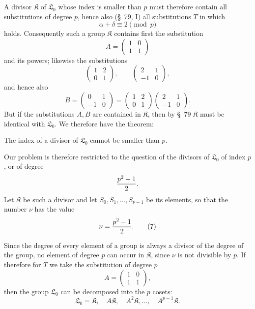 \documentclass[11pt]{article}
\providecommand{\Lzero}{\mathfrak L_0}
\providecommand{\Kgrp}{\mathfrak K}
\begin{document}
A divisor $\Kgrp$ of $\Lzero$ whose index is smaller than $p$ must therefore contain all substitutions of degree $p$, hence also (\S~79, I) all substitutions $T$ in which
\begin{equation}
 \alpha+\delta\equiv2\pmod p
\tag{4}
\end{equation}
holds. Consequently such a group $\Kgrp$ contains first the substitution
\begin{equation}
 A=\begin{pmatrix}1&0\\1&1\end{pmatrix}
\tag{5}
\end{equation}
and its powers; likewise the substitutions
\[
 \begin{pmatrix}1&2\\0&1\end{pmatrix},\qquad
 \begin{pmatrix}2&1\\-1&0\end{pmatrix},
\]
and hence also
\begin{equation}
 B=\begin{pmatrix}0&1\\-1&0\end{pmatrix}
 =
 \begin{pmatrix}1&2\\0&1\end{pmatrix}
 \begin{pmatrix}2&1\\-1&0\end{pmatrix}.
\tag{6}
\end{equation}
But if the substitutions $A,B$ are contained in $\Kgrp$, then by \S~79 $\Kgrp$ must be identical with $\Lzero$. We therefore have the theorem:

The index of a divisor of $\Lzero$ cannot be smaller than $p$.

Our problem is therefore restricted to the question of the divisors of $\Lzero$ of index $p$, or of degree
\[
 {p^2-1\over2}.
\]
Let $\Kgrp$ be such a divisor and let $S_0,S_1,\ldots,S_{\nu-1}$ be its elements, so that the number $\nu$ has the value
\begin{equation}
 \nu={p^2-1\over2}.
\tag{7}
\end{equation}

Since the degree of every element of a group is always a divisor of the degree of the group, no element of degree $p$ can occur in $\Kgrp$, since $\nu$ is not divisible by $p$. If therefore for $T$ we take the substitution of degree $p$
\begin{equation}
 A=\begin{pmatrix}1&0\\1&1\end{pmatrix},
\tag{8}
\end{equation}
then the group $\Lzero$ can be decomposed into the $p$ cosets:
\begin{equation}
 \Lzero=\Kgrp,\quad A\Kgrp,\quad A^2\Kgrp,\ldots,\quad A^{p-1}\Kgrp.
\tag{9}
\end{equation}
\end{document}
